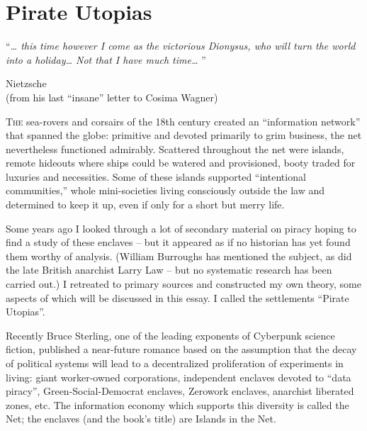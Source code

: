 \documentclass[a4paper,english,10pt,twoside]{article}
\begin{document}
\newpage
\strut
\thispagestyle{empty}
\newpage


\tableofcontents
\setcounter{page}{4}
\newpage





\section{Pirate Utopias}

\enquote{\textit{… this time however I come as the victorious Dionysus, who will turn the world into a holiday… Not that I have much time… }}
\begin{flushright}Nietzsche \\(from his last \enquote{insane} letter to Cosima Wagner)\end{flushright}

\medskip
\lettrine{T}{he} sea-rovers and corsairs of the 18th century created an \enquote{information network} that spanned the globe: primitive and devoted primarily to grim business, the net nevertheless functioned admirably. Scattered throughout the net were islands, remote hideouts where ships could be watered and provisioned, booty traded for luxuries and necessities. Some of these islands supported \enquote{intentional communities,} whole mini-societies living consciously outside the law and determined to keep it up, even if only for a short but merry life.

\medskip
Some years ago I looked through a lot of secondary material on piracy hoping to find a study of these enclaves -- but it appeared as if no historian has yet found them worthy of analysis. (William Burroughs has mentioned the subject, as did the late British anarchist Larry Law -- but no systematic research has been carried out.) I retreated to primary sources and constructed my own theory, some aspects of which will be discussed in this essay. I called the settlements \enquote{Pirate Utopias}.

\medskip
Recently Bruce Sterling, one of the leading exponents of Cyberpunk science fiction, published a near-future romance based on the assumption that the decay of political systems will lead to a decentralized proliferation of experiments in living: giant worker-owned corporations, independent enclaves devoted to \enquote{data piracy}, Green-Social-Democrat enclaves, Zerowork enclaves, anarchist liberated zones, etc. The information economy which supports this diversity is called the Net; the enclaves (and the book's title) are Islands in the Net.
\end{document}
